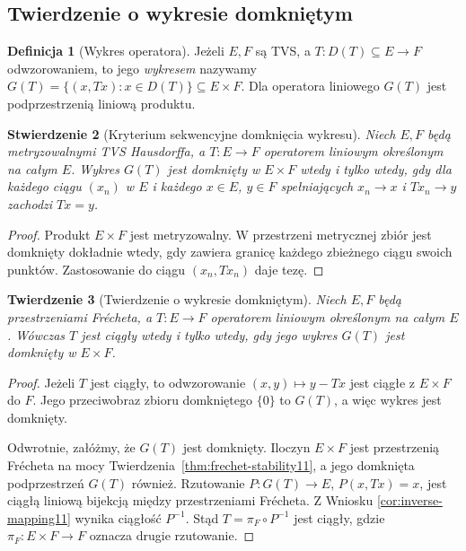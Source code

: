 \documentclass[11pt,a4paper]{article}
\numberwithin{equation}{section}
\theoremstyle{plain}
\newtheorem{twierdzenie}{Twierdzenie}[section]
\newtheorem{stwierdzenie}[twierdzenie]{Stwierdzenie}
\theoremstyle{definition}
\newtheorem{definicja}[twierdzenie]{Definicja}
\theoremstyle{remark}
\begin{document}
\subsection{Twierdzenie o wykresie domkniętym}

\begin{definicja}[Wykres operatora]\label{def:graph11}
Jeżeli $E,F$ są TVS, a $T:D(T)\subseteq E\to F$
odwzorowaniem, to jego \emph{wykresem} nazywamy
$G(T)=\{(x,Tx):x\in D(T)\}\subseteq E\times F$.
Dla operatora liniowego $G(T)$ jest podprzestrzenią
liniową produktu.
\end{definicja}

\begin{stwierdzenie}[Kryterium sekwencyjne domknięcia wykresu]
\label{prop:graph-sequential11}
Niech $E,F$ będą metryzowalnymi TVS Hausdorffa, a
$T:E\to F$ operatorem liniowym określonym na całym $E$.
Wykres $G(T)$ jest domknięty w $E\times F$ wtedy i tylko
wtedy, gdy dla każdego ciągu $(x_n)$ w $E$ i każdego
$x\in E$, $y\in F$ spełniających $x_n\to x$ i
$Tx_n\to y$ zachodzi $Tx=y$.
\end{stwierdzenie}
\begin{proof}
Produkt $E\times F$ jest metryzowalny. W przestrzeni
metrycznej zbiór jest domknięty dokładnie wtedy, gdy
zawiera granicę każdego zbieżnego ciągu swoich punktów.
Zastosowanie do ciągu $(x_n,Tx_n)$ daje tezę.
\end{proof}

\begin{twierdzenie}[Twierdzenie o wykresie domkniętym]\label{thm:closed-graph11}
Niech $E,F$ będą przestrzeniami Frécheta, a
$T:E\to F$ operatorem liniowym określonym na całym $E$.
Wówczas $T$ jest ciągły wtedy i tylko wtedy,
gdy jego wykres $G(T)$ jest domknięty w $E\times F$.
\end{twierdzenie}
\begin{proof}
Jeżeli $T$ jest ciągły, to odwzorowanie
$(x,y)\mapsto y-Tx$ jest ciągłe z $E\times F$ do $F$.
Jego przeciwobraz zbioru domkniętego $\{0\}$ to $G(T)$,
a więc wykres jest domknięty.

Odwrotnie, załóżmy, że $G(T)$ jest domknięty.
Iloczyn $E\times F$ jest przestrzenią Frécheta
na mocy Twierdzenia~\ref{thm:frechet-stability11},
a jego domknięta podprzestrzeń $G(T)$ również.
Rzutowanie
$P:G(T)\to E$, $P(x,Tx)=x$, jest ciągłą liniową
bijekcją między przestrzeniami Frécheta. Z Wniosku
\ref{cor:inverse-mapping11} wynika ciągłość $P^{-1}$.
Stąd $T=\pi_F\circ P^{-1}$ jest ciągły, gdzie
$\pi_F:E\times F\to F$ oznacza drugie rzutowanie.
\end{proof}
\end{document}
